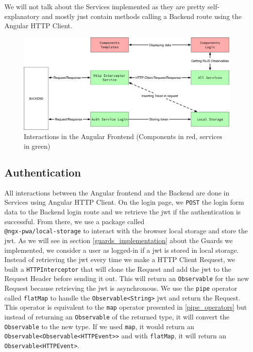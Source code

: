 \documentclass[twoside, openright,11pt,a4paper]{book}
\newenvironment{code}{\captionsetup{type=listing}}{}
\begin{document}
We will not talk about the Services implemented as they are pretty self-explanatory and mostly just contain methods calling a Backend route using the Angular HTTP Client.
\begin{figure}[H]
\begin{center}
	\includegraphics[width=\textwidth]{assets/angular_implementation}
	\caption[Interactions in the Angular Frontend]{Interactions in the Angular Frontend (Components in red, services in green)}
	\label{interactions_angular}
\end{center}
\end{figure}
\subsection{Authentication}
All interactions between the Angular frontend and the Backend are done in Services using Angular HTTP Client. On the login page, we \verb+POST+ the login form data to the Backend login route and we retrieve the \gls{jwt} if the authentication is successful. From there, we use a package called \\\verb+@ngx-pwa/local-storage+\cite{github:angular:localstorage} to interact with the browser local storage and store the \gls{jwt}. As we will see in section \ref{guards_implementation} about the Guards we implemented, we consider a user as logged-in if a \gls{jwt} is stored in local storage.\\


Instead of retrieving the \gls{jwt} every time we make a HTTP Client Request, we built a \verb+HTTPInterceptor+\cite{angular:doc:httpinterceptor} that will clone the Request and add the \gls{jwt} to the Request Header before sending it out. This will return an \verb+Observable+ for the new Request because retrieving the \gls{jwt} is asynchronous.
We use the \verb+pipe+ operator called \verb+flatMap+ to handle the \verb+Observable<String>+ \gls{jwt} and return the Request. This operator is equivalent to the \verb+map+ operator presented in \ref{pipe_operators} but instead of returning an \verb+Observable+ of the returned type, it will convert the \verb+Observable+ to the new type.
If we used \verb+map+, it would return an \verb+Observable<Observable<HTTPEvent>>+ and with \verb+flatMap+, it will return an \verb+Observable<HTTPEvent>+.
\begin{code}
	\caption{The HTTP Interceptor Service that inserts the JWT in the Request}
\end{code}
\end{document}
